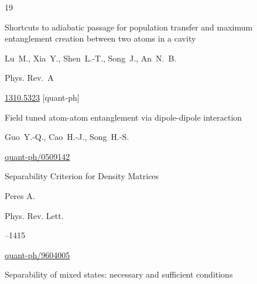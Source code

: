 \begin{thebibliography}{19}










\paper Shortcuts to adiabatic passage for population transfer and maximum entanglement creation between two atoms in a cavity

\by   Lu~M.,  Xia~Y., Shen~L.-T., Song~J., An~N.~B.

\jour Phys. Rev.~A






\arxiv \href{http://arxiv.org/abs/1310.5323}{1310.5323} [quant-ph]






\preprint Field tuned atom-atom entanglement via dipole-dipole interaction

\by    Guo~Y.-Q.,  Cao~H.-J.,  Song~H.-S.

\arxiv \href{http://arxiv.org/abs/quant-ph/0509142}{quant-ph/0509142}










\paper Separability Criterion for Density Matrices

\by   Peres A.

\jour Phys. Rev. Lett.




--1415


\arxiv \href{http://arxiv.org/abs/quant-ph/9604005}{quant-ph/9604005}




\paper  Separability of mixed states: necessary and sufficient conditions 


\end{thebibliography}
